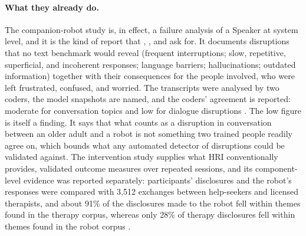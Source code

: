 \paragraph{What they already do.} The companion-robot study is, in effect, a
failure analysis of a Speaker at system level, and it is the kind of report
that , , and  ask for. It
documents disruptions that no text benchmark would reveal (frequent
interruptions; slow, repetitive, superficial, and incoherent responses;
language barriers; hallucinations; outdated information) together with their
consequences for the people involved, who were left frustrated, confused,
and worried. The transcripts were analysed by two coders, the model
snapshots are named, and the coders' agreement is reported: moderate for
conversation topics and low for dialogue disruptions
\cite{irfan2025between}. The low figure is itself a finding. It says that
what counts as a disruption in conversation between an older adult and a
robot is not something two trained people readily agree on, which bounds
what any automated detector of disruptions could be validated against. The intervention study supplies what HRI
conventionally provides, validated outcome measures over repeated sessions,
and its component-level evidence was reported separately: participants'
disclosures and the robot's responses were compared with 3{,}512 exchanges
between help-seekers and licensed therapists, and about 91\% of the
disclosures made to the robot fell within themes found in the therapy
corpus, whereas only 28\% of therapy disclosures fell within themes found in
the robot corpus \cite{chiang2025talk}.

